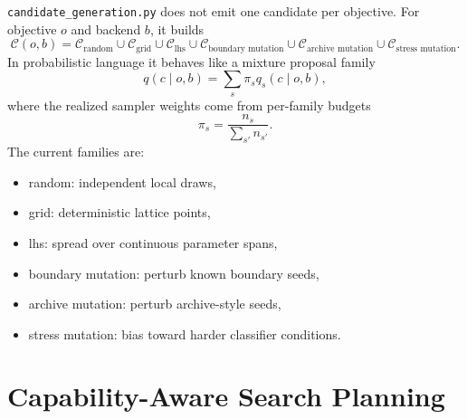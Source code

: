 \documentclass[11pt]{article}
\begin{document}
\texttt{candidate\_generation.py} does not emit one candidate per objective.
For objective \(o\) and backend \(b\), it builds
\begin{equation}
    \mathcal{C}(o,b)
    =
    \mathcal{C}_{\text{random}}
    \cup
    \mathcal{C}_{\text{grid}}
    \cup
    \mathcal{C}_{\text{lhs}}
    \cup
    \mathcal{C}_{\text{boundary mutation}}
    \cup
    \mathcal{C}_{\text{archive mutation}}
    \cup
    \mathcal{C}_{\text{stress mutation}}.
\end{equation}
In probabilistic language it behaves like a mixture proposal family
\begin{equation}
    q(c \mid o,b)
    =
    \sum_s \pi_s q_s(c \mid o,b),
\end{equation}
where the realized sampler weights come from per-family budgets
\begin{equation}
    \pi_s = \frac{n_s}{\sum_{s'} n_{s'}}.
\end{equation}
The current families are:
\begin{itemize}[leftmargin=1.5em]
    \item random: independent local draws,
    \item grid: deterministic lattice points,
    \item lhs: spread over continuous parameter spans,
    \item boundary mutation: perturb known boundary seeds,
    \item archive mutation: perturb archive-style seeds,
    \item stress mutation: bias toward harder classifier conditions.
\end{itemize}

\section{Capability-Aware Search Planning}
\end{document}
